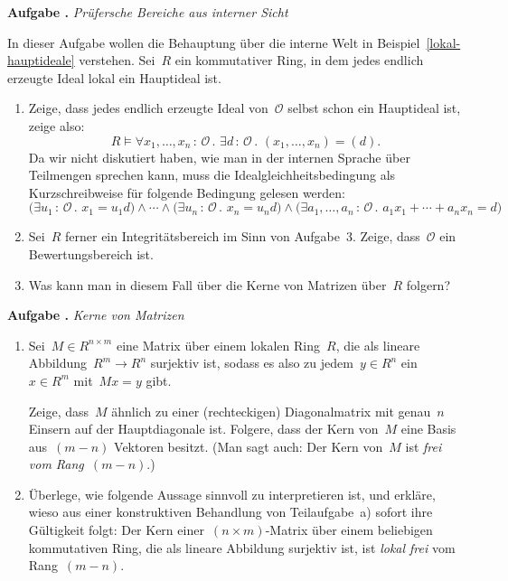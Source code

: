 \documentclass[a4paper,ngerman,12pt]{scrartcl}
\theoremstyle{definition}
\theoremstyle{plain}
\theoremstyle{remark}
\renewcommand{\O}{\mathcal{O}}
\renewcommand{\_}{\mathpunct{.}\,}
\newcommand{\?}{\,{:}\,}
\newlength{\aufgabenskip}
\newcounter{aufgabennummer}
\newenvironment{aufgabe}[1]{
  \addtocounter{aufgabennummer}{1}
  \textbf{Aufgabe \theaufgabennummer{}.} \emph{#1} \par
}{\vspace{\aufgabenskip}}
\begin{document}
\begin{aufgabe}{Prüfersche Bereiche aus interner Sicht}
In dieser Aufgabe wollen die Behauptung über die interne Welt in
Beispiel~\ref{lokal-hauptideale} verstehen.
Sei~$R$ ein kommutativer Ring, in dem jedes
endlich erzeugte Ideal lokal ein Hauptideal ist.
\begin{enumerate}
\item Zeige, dass jedes endlich
erzeugte Ideal von~$\O$ selbst schon ein Hauptideal ist, zeige also:
\[ R \models
  \forall x_1,\ldots,x_n\?\O\_
  \exists d\?\O\_
  (x_1,\ldots,x_n) = (d). \]
Da wir nicht diskutiert haben, wie man in der internen Sprache über Teilmengen
sprechen kann, muss die Idealgleichheitsbedingung als Kurzschreibweise für
folgende Bedingung gelesen werden:
\[
  \bigl(\exists u_1\?\O\_ x_1 = u_1 d\bigr) \wedge
  \cdots \wedge
  \bigl(\exists u_n\?\O\_ x_n = u_n d\bigr) \wedge
  \bigl(\exists a_1,\ldots,a_n\?\O\_ a_1 x_1 + \cdots + a_n x_n = d\bigr)
\]
\item Sei~$R$ ferner ein Integritätsbereich im Sinn von Aufgabe~3. Zeige,
dass~$\O$ ein Bewertungsbereich ist.
\item Was kann man in diesem Fall über die Kerne von Matrizen über~$R$ folgern?
\end{enumerate}
\end{aufgabe}

\begin{aufgabe}{Kerne von Matrizen}
\begin{enumerate}
\item Sei~$M \in R^{n \times m}$ eine Matrix über einem lokalen Ring~$R$, die
als lineare Abbildung~$R^m \to R^n$ surjektiv ist, sodass es also zu jedem~$y
\in R^n$ ein~$x \in R^m$ mit~$Mx = y$ gibt.

Zeige, dass~$M$ ähnlich zu einer (rechteckigen) Diagonalmatrix mit genau~$n$
Einsern auf der Hauptdiagonale ist. Folgere, dass der Kern von~$M$ eine Basis
aus~$(m - n)$ Vektoren besitzt. (Man sagt auch: Der Kern von~$M$ ist \emph{frei
vom Rang~$(m-n)$}.)

\item Überlege, wie folgende Aussage sinnvoll zu interpretieren ist, und
erkläre, wieso aus einer konstruktiven Behandlung von Teilaufgabe~a) sofort
ihre Gültigkeit folgt:
Der Kern einer~$(n \times m)$-Matrix über einem beliebigen kommutativen
Ring, die als lineare Abbildung surjektiv ist, ist \emph{lokal frei} vom
Rang~$(m-n)$.
\end{enumerate}
\end{aufgabe}
\end{document}
